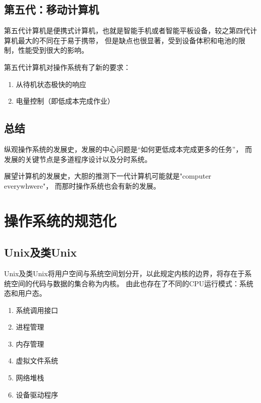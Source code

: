 
\subsection{第五代：移动计算机}

第五代计算机是便携式计算机，也就是智能手机或者智能平板设备，较之第四代计算机最大的不同在于易于携带，
但是缺点也很显著，受到设备体积和电池的限制，性能受到很大的影响。

第五代计算机对操作系统有了新的要求：
\begin{enumerate}
  \item 从待机状态极快的响应
  \item 电量控制（即低成本完成作业）
\end{enumerate}


\subsection{总结}

纵观操作系统的发展史，发展的中心问题是“如何更低成本完成更多的任务”，
而发展的关键节点是多道程序设计以及分时系统。

展望计算机的发展史，大胆的推测下一代计算机可能就是"computer everywhwere"，
而那时操作系统也会有新的发展。

\section{操作系统的规范化}

\subsection{Unix及类Unix}
Unix及类Unix将用户空间与系统空间划分开，以此规定内核的边界，将存在于系统空间的代码与数据的集合称为内核。
由此也存在了不同的CPU运行模式：系统态和用户态。
\begin{enumerate}
  \item 系统调用接口
  \item 进程管理
  \item 内存管理
  \item 虚拟文件系统
  \item 网络堆栈
  \item 设备驱动程序
\end{enumerate}


